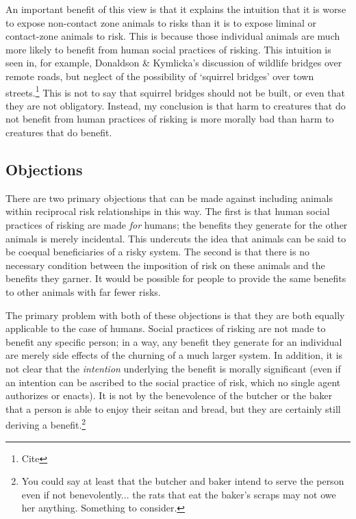 An important benefit of this view is that it explains the intuition that it is
worse to expose non-contact zone animals to risks than it is to expose liminal
or contact-zone animals to risk. This is because those individual animals are
much more likely to benefit from human social practices of risking. This
intuition is seen in, for example, Donaldson \& Kymlicka’s discussion of
wildlife bridges over remote roads, but neglect of the possibility of ‘squirrel
bridges’ over town streets.\footnote{Cite} This is not to say that squirrel
bridges should not be built, or even that they are not obligatory. Instead, my
conclusion is that harm to creatures that do not benefit from human practices
of risking is more morally bad than harm to creatures that do benefit.

\subsection{Objections}

There are two primary objections that can be made against including animals
within reciprocal risk relationships in this way. The first is that human
social practices of risking are made \emph{for} humans; the benefits they
generate for the other animals is merely incidental. This undercuts the idea
that animals can be said to be coequal beneficiaries of a risky system.
The second is that there is no necessary condition between the imposition of
risk on these animals and the benefits they garner. It would be possible for
people to provide the same benefits to other animals with far fewer risks.

The primary problem with both of these objections is that they are both equally
applicable to the case of humans. Social practices of risking are not made to
benefit any specific person; in a way, any benefit they generate for an
individual are merely side effects of the churning of a much larger system. In
addition, it is not clear that the \emph{intention} underlying the benefit is
morally significant (even if an intention can be ascribed to the social
practice of risk, which no single agent authorizes or enacts). It is not by the
benevolence of the butcher or the baker that a person is able to enjoy their
seitan and bread, but they are certainly still deriving a benefit.\footnote{You
could say at least that the butcher and baker intend to serve the person even
if not benevolently... the rats that eat the baker’s scraps may not owe her
anything. Something to consider.}

